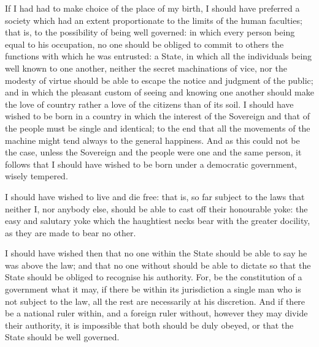 \documentclass[12pt]{report}
\begin{document}
If I had had to make choice of the place of my birth, I should have preferred a society which had an extent proportionate to the limits of the human faculties; that is, to the possibility of being well governed: in which every person being equal to his occupation, no one should be obliged to commit to others the functions with which he was entrusted: a State, in which all the individuals being well known to one another, neither the secret machinations of vice, nor the modesty of virtue should be able to escape the notice and judgment of the public; and in which the pleasant custom of seeing and knowing one another should make the love of country rather a love of the citizens than of its soil.
I should have wished to be born in a country in which the interest of the Sovereign and that of the people must be single and identical; to the end that all the movements of the machine might tend always to the general happiness. And as this could not be the case, unless the Sovereign and the people were one and the same person, it follows that I should have wished to be born under a democratic government, wisely tempered.

I should have wished to live and die free: that is, so far subject to the laws that neither I, nor anybody else, should be able to cast off their honourable yoke: the easy and salutary yoke which the haughtiest necks bear with the greater docility, as they are made to bear no other.

I should have wished then that no one within the State should be able to say he was above the law; and that no one without should be able to dictate so that the State should be obliged to recognise his authority. For, be the constitution of a government what it may, if there be within its jurisdiction a single man who is not subject to the law, all the rest are necessarily at his discretion. And if there be a national ruler within, and a foreign ruler without, however they may divide their authority, it is impossible that both should be duly obeyed, or that the State should be well governed.
\end{document}
